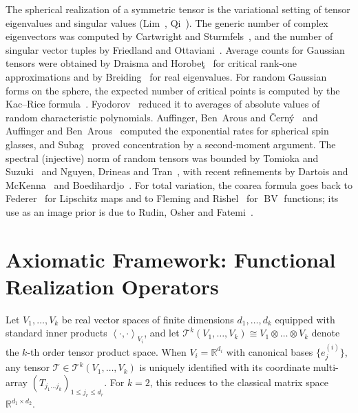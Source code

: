 \documentclass[11pt,a4paper,reqno]{amsart}
\theoremstyle{definition}
\numberwithin{equation}{section}
\newcommand{\R}{\mathbb{R}}
\newcommand{\BV}{\operatorname{BV}}
\newcommand{\inner}[2]{\left\langle #1, #2 \right\rangle}
\begin{document}
The spherical realization of a symmetric tensor is the variational setting of tensor eigenvalues and singular values (Lim~\cite{lim2005singular}, Qi~\cite{qi2005eigenvalues}). The generic number of complex eigenvectors was computed by Cartwright and Sturmfels~\cite{cartwright2013number}, and the number of singular vector tuples by Friedland and Ottaviani~\cite{friedland2014number}. Average counts for Gaussian tensors were obtained by Draisma and Horobe\c{t}~\cite{draisma2016average} for critical rank-one approximations and by Breiding~\cite{breiding2017expected} for real eigenvalues. For random Gaussian forms on the sphere, the expected number of critical points is computed by the Kac--Rice formula~\cite{kac1943average,adler2007random}. Fyodorov~\cite{fyodorov2004complexity} reduced it to averages of absolute values of random characteristic polynomials. Auffinger, Ben~Arous and \v{C}ern\'y~\cite{auffinger2013random} and Auffinger and Ben~Arous~\cite{auffinger2013complexity} computed the exponential rates for spherical spin glasses, and Subag~\cite{subag2017complexity} proved concentration by a second-moment argument. The spectral (injective) norm of random tensors was bounded by Tomioka and Suzuki~\cite{tomioka2014spectral} and Nguyen, Drineas and Tran~\cite{nguyen2015tensor}, with recent refinements by Dartois and McKenna~\cite{dartois2024injective} and Boedihardjo~\cite{boedihardjo2024injective}. For total variation, the coarea formula goes back to Federer~\cite{federer1959curvature} for Lipschitz maps and to Fleming and Rishel~\cite{fleming1960integral} for $\BV$ functions; its use as an image prior is due to Rudin, Osher and Fatemi~\cite{rudin1992nonlinear}.

\section{Axiomatic Framework: Functional Realization Operators}
\label{sec:framework}

Let $V_1, \dots, V_k$ be real vector spaces of finite dimensions $d_1, \dots, d_k$ equipped with standard inner products $\inner{\cdot}{\cdot}_{V_i}$, and let $\mathcal{T}^k(V_1, \dots, V_k) \cong V_1 \otimes \dots \otimes V_k$ denote the $k$-th order tensor product space. When $V_i = \R^{d_i}$ with canonical bases $\{e_{j}^{(i)}\}$, any tensor $\mathcal{T} \in \mathcal{T}^k(V_1, \dots, V_k)$ is uniquely identified with its coordinate multi-array $(T_{j_1 \dots j_k})_{1 \le j_r \le d_r}$. For $k=2$, this reduces to the classical matrix space $\R^{d_1 \times d_2}$.
\end{document}

